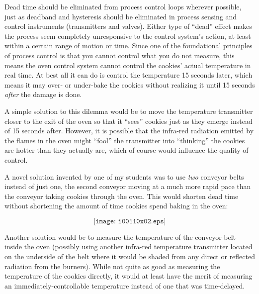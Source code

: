 Dead time should be eliminated from process control loops wherever possible, just as deadband and hysteresis should be eliminated in process sensing and control instruments (transmitters and valves).  Either type of ``dead'' effect makes the process seem completely unresponsive to the control system's action, at least within a certain range of motion or time.  Since one of the foundational principles of process control is that you cannot control what you do not measure, this means the oven control system cannot control the cookies' actual temperature in real time.  At best all it can do is control the temperature 15 seconds later, which means it may over- or under-bake the cookies without realizing it until 15 seconds {\it after} the damage is done.

\vskip 10pt

A simple solution to this dilemma would be to move the temperature transmitter closer to the exit of the oven so that it ``sees'' cookies just as they emerge instead of 15 seconds after.  However, it is possible that the infra-red radiation emitted by the flames in the oven might ``fool'' the transmitter into ``thinking'' the cookies are hotter than they actually are, which of course would influence the quality of control.

A novel solution invented by one of my students was to use {\it two} conveyor belts instead of just one, the second conveyor moving at a much more rapid pace than the conveyor taking cookies through the oven.  This would shorten dead time without shortening the amount of time cookies spend baking in the oven:

$$\texttt{[image: i00110x02.eps]}$$

Another solution would be to measure the temperature of the conveyor belt inside the oven (possibly using another infra-red temperature transmitter located on the underside of the belt where it would be shaded from any direct or reflected radiation from the burners).  While not quite as good as measuring the temperature of the cookies directly, it would at least have the merit of measuring an immediately-controllable temperature instead of one that was time-delayed.






